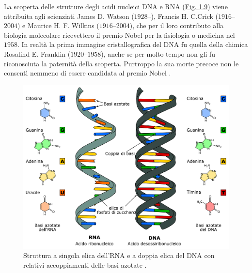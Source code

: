 \documentclass[12pt,a4paper,twoside]{report}
\begin{document}
	La scoperta delle strutture degli acidi nucleici DNA e RNA (\hyperref[fig:dna_structure]{Fig. 1.9}) viene attribuita agli scienziati James D. Watson ($1928$--), Francis H. C.Crick ($1916$--$2004$) e Maurice H. F. Wilkins ($1916$--$2004$), che per il loro contributo alla biologia molecolare ricevettero il premio Nobel per la fisiologia o medicina nel $1958$. In realtà la prima immagine cristallografica del DNA fu quella della chimica Rosalind E. Franklin ($1920$--$1958$), anche se per molto tempo non gli fu riconosciuta la paternità della scoperta. Purtroppo la sua morte precoce non le consentì nemmeno di essere candidata al premio Nobel \cite{campbell3anno}.
	\begin{figure}[H]
		\centering
		\includegraphics[width=0.9\linewidth]{dna_structure.pdf}
		\caption{Struttura a singola elica dell'RNA e a doppia elica del DNA con relativi accoppiamenti delle basi azotate \cite{nucleic_acids_wiki}.}
		\label{fig:dna_structure}
	\end{figure}
\end{document}
